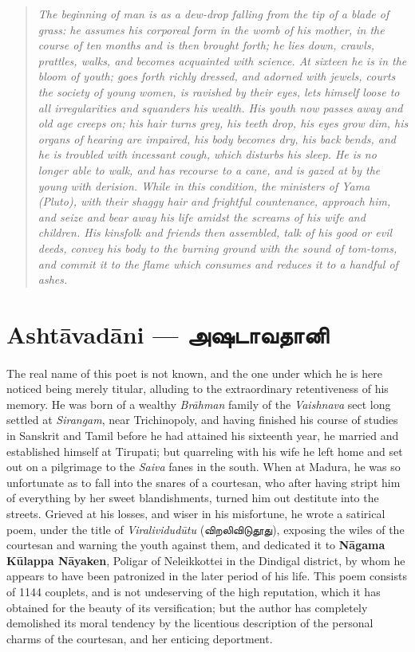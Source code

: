 \documentclass{article}
\newcommand{\TamilText}[1]{\texttamil{#1}}
\newcommand{\TamilBold}[1]{\texttamil{\textbf{#1}}}
\newcommand{\tam}[1]{\TamilText{#1}}
\newcommand{\tambold}[1]{\TamilBold{#1}}
\begin{document}
\begin{quotation}\small
\emph{The beginning of man is as a dew-drop falling from the tip of a blade of grass: he assumes his corporeal form in the womb of his mother, in the course of ten months and is then brought forth; he lies down, crawls, prattles, walks, and becomes acquainted with science. At sixteen he is in the bloom of youth; goes forth richly dressed, and adorned with jewels, courts the society of young women, is ravished by their eyes, lets himself loose to all irregularities and squanders his wealth. His youth now passes away and old age creeps on; his hair turns grey, his teeth drop, his eyes grow dim, his organs of hearing are impaired, his body becomes dry, his back bends, and he is troubled with incessant cough, which disturbs his sleep. He is no longer able to walk, and has recourse to a cane, and is gazed at by the young with derision. While in this condition, the ministers of Yama (Pluto), with their shaggy hair and frightful countenance, approach him, and seize and bear away his life amidst the screams of his wife and children. His kinsfolk and friends then assembled, talk of his good or evil deeds, convey his body to the burning ground with the sound of tom-toms, and commit it to the flame which consumes and reduces it to a handful of ashes.}
\end{quotation}
\section{Asht\={a}vad\={a}ni --- \tambold{அஷடாவதானி}}
\paragraph{}
The real name of this poet is not known, and the one under which he is here noticed being merely titular, alluding to the extraordinary retentiveness of his memory. He was born of a wealthy \emph{Br\={a}hman} family of the \emph{Vaishnava} sect long settled at \emph{Sirangam}, near Trichinopoly, and having finished his course of studies in Sanskrit and Tamil before he had attained his sixteenth year, he married and established himself at Tirupati; but quarreling with his wife he left home and set out on a pilgrimage to the \emph{Saiva} fanes in the south. When at Madura, he was so unfortunate as to fall into the snares of a courtesan, who after having stript him of everything by her sweet blandishments, turned him out destitute into the streets. Grieved at his losses, and wiser in his misfortune, he wrote a satirical poem, under the title of \emph{Viralividud\={u}tu} (\tam{விறலிவிடுதூது}), exposing the wiles of the courtesan and warning the youth against them, and dedicated it to \textbf{N\={a}gama K\={u}lappa N\={a}yaken}, Poligar of Neleikkottei in the Dindigal district, by whom he appears to have been patronized in the later period of his life. This poem consists of 1144 couplets, and is not undeserving of the high reputation, which it has obtained for the beauty of its versification; but the author has completely demolished its moral tendency by the licentious description of the personal charms of the courtesan, and her enticing deportment.
\end{document}
